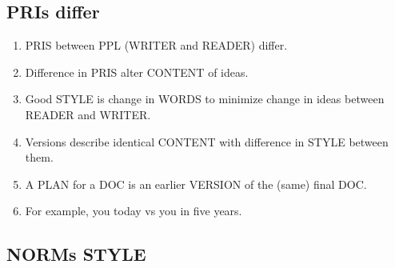 \documentclass[
]{book}
\providecommand{\tightlist}{%
  \setlength{\itemsep}{0pt}\setlength{\parskip}{0pt}}
\begin{document}
\hypertarget{pris-differ}{%
\subsection{PRIs differ}\label{pris-differ}}

\begin{enumerate}
\def\labelenumi{\arabic{enumi}.}
\setcounter{enumi}{17}
\tightlist
\item
  PRIS between PPL (WRITER and READER) differ.
\item
  Difference in PRIS alter CONTENT of ideas.
\item
  Good STYLE is change in WORDS to minimize change in ideas between
  READER and WRITER.
\item
  Versions describe identical CONTENT with difference in STYLE between them.
\item
  A PLAN for a DOC is an earlier VERSION of the (same) final DOC.
\item
  For example, you today vs you in five years.
\end{enumerate}

\hypertarget{norms-style}{%
\subsection{NORMs STYLE}\label{norms-style}}
\end{document}

